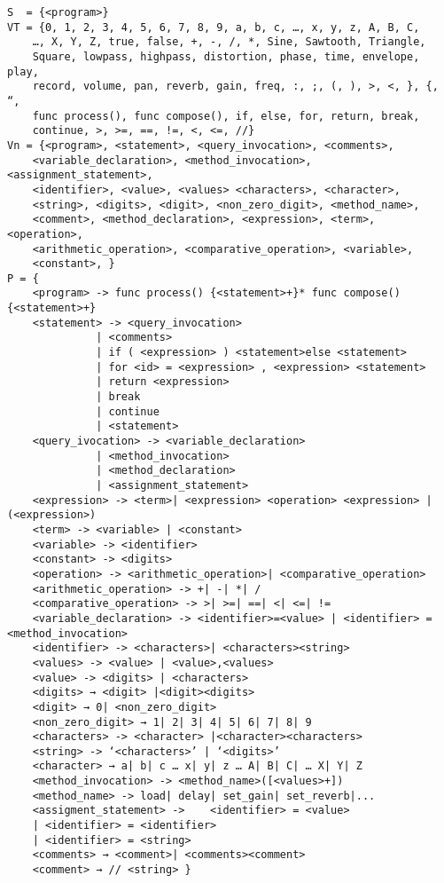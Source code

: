 \begin{verbatim}
S  = {<program>}
VT = {0, 1, 2, 3, 4, 5, 6, 7, 8, 9, a, b, c, …, x, y, z, A, B, C, 
    …, X, Y, Z, true, false, +, -, /, *, Sine, Sawtooth, Triangle, 
    Square, lowpass, highpass, distortion, phase, time, envelope, play, 
    record, volume, pan, reverb, gain, freq, :, ;, (, ), >, <, }, {, “, 
    func process(), func compose(), if, else, for, return, break, 
    continue, >, >=, ==, !=, <, <=, //}
Vn = {<program>, <statement>, <query_invocation>, <comments>, 
    <variable_declaration>, <method_invocation>, <assignment_statement>, 
    <identifier>, <value>, <values> <characters>, <character>, 
    <string>, <digits>, <digit>, <non_zero_digit>, <method_name>, 
    <comment>, <method_declaration>, <expression>, <term>, <operation>, 
    <arithmetic_operation>, <comparative_operation>, <variable>, 
    <constant>, }
P = {
    <program> -> func process() {<statement>+}* func compose() {<statement>+}
    <statement> -> <query_invocation>
              | <comments>
              | if ( <expression> ) <statement>else <statement>
              | for <id> = <expression> , <expression> <statement>
              | return <expression> 
              | break  
              | continue 
              | <statement>
    <query_ivocation> -> <variable_declaration> 
              | <method_invocation> 
              | <method_declaration>
              | <assignment_statement>
    <expression> -> <term>| <expression> <operation> <expression> | (<expression>)
    <term> -> <variable> | <constant>
    <variable> -> <identifier>
    <constant> -> <digits>
    <operation> -> <arithmetic_operation>| <comparative_operation>
    <arithmetic_operation> -> +| -| *| /
    <comparative_operation> -> >| >=| ==| <| <=| !=
    <variable_declaration> -> <identifier>=<value> | <identifier> = <method_invocation>
    <identifier> -> <characters>| <characters><string>
    <values> -> <value> | <value>,<values>
    <value> -> <digits> | <characters>
    <digits> → <digit> |<digit><digits>
    <digit> → 0| <non_zero_digit>
    <non_zero_digit> → 1| 2| 3| 4| 5| 6| 7| 8| 9
    <characters> -> <character> |<character><characters>
    <string> -> ‘<characters>’ | ‘<digits>’
    <character> → a| b| c … x| y| z … A| B| C| … X| Y| Z
    <method_invocation> -> <method_name>([<values>+])
    <method_name> -> load| delay| set_gain| set_reverb|...
    <assigment_statement> -> 	<identifier> = <value> 
    | <identifier> = <identifier> 
    | <identifier> = <string>
    <comments> → <comment>| <comments><comment>
    <comment> → // <string> }
\end{verbatim}

